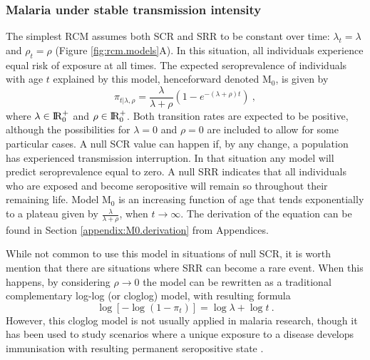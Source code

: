 \subsubsection{Malaria under stable transmission intensity}

The simplest RCM assumes both SCR and SRR to be constant over time: $\lambda_t =\lambda$ and $\rho_t = \rho$ (Figure \ref{fig:rcm.models}A).
In this situation, all individuals experience equal risk of exposure at all times.
The expected seroprevalence of individuals with age $t$ explained by this model, henceforward denoted M$_0$, is given by
%
\begin{equation}
    \label{eq:M0}
    \pi_{t|\lambda, \rho}=\frac{\lambda}{\lambda+\rho}\left(1-e^{-(\lambda+\rho)t}\right)\ ,
\end{equation}
%
\noindent
where $\lambda \in \rm I\!R_{0}^{+}$ and $\rho \in \rm I\!R_{0}^{+}$.
Both transition rates are expected to be positive, although the possibilities for $\lambda=0$ and $\rho=0$ are included to allow for some particular cases.
A null SCR value can happen if, by any change, a population has experienced transmission interruption.
In that situation any model will predict seroprevalence equal to zero.
A null SRR indicates that all individuals who are exposed and become seropositive will remain so throughout their remaining life.
Model M$_0$ is an increasing function of age that tends exponentially to a plateau given by $\textstyle\frac{\lambda}{\lambda+\rho}$, when $t\rightarrow\infty$.
The derivation of the equation can be found in Section \ref{appendix:M0.derivation} from Appendices.

While not common to use this model in situations of null SCR, it is worth mention that there are situations where SRR can become a rare event.
When this happens, by considering $\rho\rightarrow0$ the model can be rewritten as a traditional complementary log-log (or cloglog) model, with resulting formula
%
\begin{equation}
    \label{eq:rcm.cloglog}
    \log[-\log(1-\pi_t)]=\log\lambda+\log t\ .
\end{equation}
%
\noindent
However, this cloglog model is not usually applied in malaria research, though it has been used to study scenarios where a unique exposure to a disease develops immunisation with resulting permanent seropositive state \cite{hens2012modeling}.


